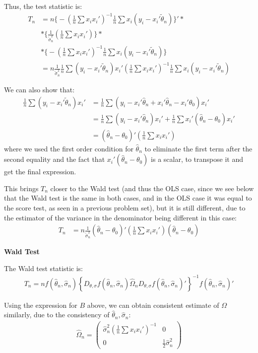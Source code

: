 \documentclass[12pt]{paper}
\begin{document}
Thus, the test statistic is:
\begin{align*}
T_n&=n\Big\{-\left(\frac{1}{n}\sum{x_ix_i'}\right)^{-1}\frac{1}{n}\sum{x_i(y_i-x_i'\tilde{\theta}_n)}\Big\}'*\\
&*\Big\{\frac{1}{\tilde{\sigma}_n^2}\left(\frac{1}{n}\sum{x_ix_i'}\right)\Big\}*\\
&*\Big\{-\left(\frac{1}{n}\sum{x_ix_i'}\right)^{-1}\frac{1}{n}\sum{x_i(y_i-x_i'\tilde{\theta}_n)}\Big\}\\
&=n\frac{1}{\tilde{\sigma}_n^2}\frac{1}{n}\sum{(y_i-x_i'\tilde{\theta}_n)x_i'}\left(\frac{1}{n}\sum{x_ix_i'}\right)^{-1}\frac{1}{n}\sum{x_i(y_i-x_i'\tilde{\theta}_n)}
\end{align*}

We can also show that:
\begin{align*}
\frac{1}{n}\sum{(y_i-x_i'\tilde{\theta}_n)x_i'}&=\frac{1}{n}\sum{(y_i-x_i'\hat{\theta}_n+x_i'\hat{\theta}_n-x_i'\theta_0)x_i'}\\
&=\frac{1}{n}\sum{(y_i-x_i'\hat{\theta}_n)x_i'}+\frac{1}{n}\sum{x_i'(\hat{\theta}_n-\theta_0)x_i'}\\
&=(\hat{\theta}_n-\theta_0)'\left(\frac{1}{n}\sum{x_ix_i'}\right)
\end{align*}
\noindent where we used the first order condition for $\hat{\theta}_n$ to eliminate the first term after the second equality and the fact that $x_i'(\hat{\theta}_n-\theta_0)$ is a scalar, to transpose it and get the final expression.

This brings $T_n$ closer to the Wald test (and thus the OLS case, since we see below that the Wald test is the same in both cases, and in the OLS case it was equal to the score test, as seen in a previous problem set), but it is still different, due to the estimator of the variance in the denominator being different in this case:
\begin{align*}
T_n&=n\frac{1}{\tilde{\sigma}_n^2}(\hat{\theta}_n-\theta_0)'\left(\frac{1}{n}\sum{x_ix_i'}\right)(\hat{\theta}_n-\theta_0)
\end{align*}

\textbf{Wald Test}

The Wald test statistic is:
\begin{align*}
T_n=nf(\hat{\theta}_n,\hat{\sigma}_n)\left\{D_{\theta,\sigma}f(\hat{\theta}_n,\hat{\sigma}_n)\hat{\Omega}_nD_{\theta,\sigma}f(\hat{\theta}_n,\hat{\sigma}_n)'\right\}^{-1}f(\hat{\theta}_n,\hat{\sigma}_n)'
\end{align*}

Using the expression for $B$ above, we can obtain consistent estimate of $\Omega$ similarly, due to the consistency of $\hat{\theta}_n,\hat{\sigma}_n$:
\begin{align*}
\hat{\Omega}_n=\begin{pmatrix}
\hat{\sigma}_n^2\left(\frac{1}{n}\sum{x_ix_i'}\right)^{-1} & 0\\
0 & \frac{1}{2}\hat{\sigma}_n^2
\end{pmatrix}
\end{align*}
\end{document}
